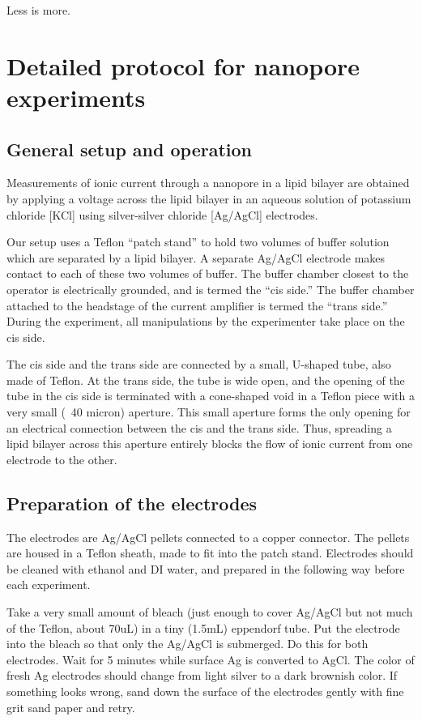 \begin{savequote}[75mm]
Less is more.
\end{savequote}

\chapter{Detailed protocol for nanopore experiments}
\label{protocol}

\section{General setup and operation}

Measurements of ionic current through a nanopore in a lipid bilayer are obtained by applying a voltage across the lipid bilayer in an aqueous solution of potassium chloride [KCl] using silver-silver chloride [Ag/AgCl] electrodes.

Our setup uses a Teflon “patch stand” to hold two volumes of buffer solution which are separated by a lipid bilayer.  A separate Ag/AgCl electrode makes contact to each of these two volumes of buffer.  The buffer chamber closest to the operator is electrically grounded, and is termed the “cis side.”  The buffer chamber attached to the headstage of the current amplifier is termed the “trans side.”  During the experiment, all manipulations by the experimenter take place on the cis side.

The cis side and the trans side are connected by a small, U-shaped tube, also made of Teflon.  At the trans side, the tube is wide open, and the opening of the tube in the cis side is terminated with a cone-shaped void in a Teflon piece with a very small (~40 micron) aperture.  This small aperture forms the only opening for an electrical connection between the cis and the trans side.  Thus, spreading a lipid bilayer across this aperture entirely blocks the flow of ionic current from one electrode to the other.

\section{Preparation of the electrodes}

The electrodes are Ag/AgCl pellets connected to a copper connector.  The pellets are housed in a Teflon sheath, made to fit into the patch stand.  Electrodes should be cleaned with ethanol and DI water, and prepared in the following way before each experiment.

Take a very small amount of bleach (just enough to cover Ag/AgCl but not much of the Teflon, about 70uL) in a tiny (1.5mL) eppendorf tube.  Put the electrode into the bleach so that only the Ag/AgCl is submerged.  Do this for both electrodes.  Wait for 5 minutes while surface Ag is converted to AgCl.  The color of fresh Ag electrodes should change from light silver to a dark brownish color.  If something looks wrong, sand down the surface of the electrodes gently with fine grit sand paper and retry.

